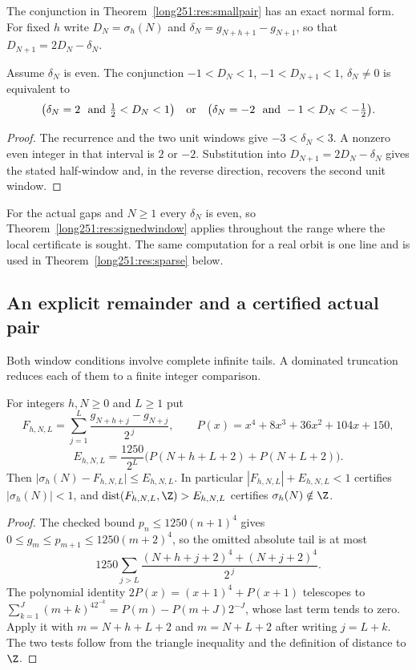 The conjunction in Theorem~\ref{long251:res:smallpair} has an exact normal form.  For
fixed $h$ write $D_N=\sigma_h(N)$ and $\delta_N=g_{N+h+1}-g_{N+1}$, so that
$D_{N+1}=2D_N-\delta_N$.

\begin{theorem}\label{long251:res:signedwindow}
Assume $\delta_N$ is even.  The conjunction
$-1<D_N<1$, $-1<D_{N+1}<1$, $\delta_N\ne0$ is equivalent to
\[
 \bigl(\delta_N=2\ \hbox{ and }\tfrac12<D_N<1\bigr)
 \quad\hbox{or}\quad
 \bigl(\delta_N=-2\ \hbox{ and }-1<D_N<-\tfrac12\bigr).
\]
\end{theorem}

\begin{proof}
The recurrence and the two unit windows give $-3<\delta_N<3$.  A nonzero even
integer in that interval is $2$ or $-2$.  Substitution into
$D_{N+1}=2D_N-\delta_N$ gives the stated half-window and, in the reverse
direction, recovers the second unit window.
\end{proof}

For the actual gaps and $N\ge1$ every $\delta_N$ is even, so
Theorem~\ref{long251:res:signedwindow} applies throughout the range where the local
certificate is sought.  The same computation for a real orbit is one line and
is used in Theorem~\ref{long251:res:sparse} below.

\subsection{An explicit remainder and a certified actual pair}

Both window conditions involve complete infinite tails.  A dominated
truncation reduces each of them to a finite integer comparison.

\begin{proposition}\label{long251:res:explicit-remainder}
For integers $h,N\ge0$ and $L\ge1$ put
\[
 F_{h,N,L}=\sum_{j=1}^{L}\frac{g_{N+h+j}-g_{N+j}}{2^{\,j}},\qquad
 P(x)=x^4+8x^3+36x^2+104x+150,
\]
\[
 E_{h,N,L}=\frac{1250}{2^{L}}\bigl(P(N+h+L+2)+P(N+L+2)\bigr).
\]
Then $\bigl|\sigma_h(N)-F_{h,N,L}\bigr|\le E_{h,N,L}$.  In particular
$|F_{h,N,L}|+E_{h,N,L}<1$ certifies $|\sigma_h(N)|<1$, and
$\operatorname{dist}(F_{h,N,L},\Z)>E_{h,N,L}$ certifies
$\sigma_h(N)\notin\Z$.
\end{proposition}

\begin{proof}
The checked bound $p_n\le1250(n+1)^4$ gives $0\le g_m\le p_{m+1}\le1250(m+2)^4$,
so the omitted absolute tail is at most
\[
 1250\sum_{j>L}\frac{(N+h+j+2)^4+(N+j+2)^4}{2^{\,j}} .
\]
The polynomial identity $2P(x)=(x+1)^4+P(x+1)$ telescopes to
$\sum_{k=1}^{J}(m+k)^42^{-k}=P(m)-P(m+J)2^{-J}$, whose last term tends to zero.
Apply it with $m=N+h+L+2$ and $m=N+L+2$ after writing $j=L+k$.  The two tests
follow from the triangle inequality and the definition of distance to $\Z$.
\end{proof}

